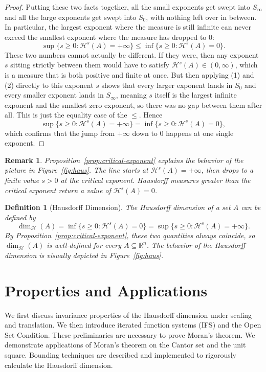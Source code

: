 \documentclass{article}
\newtheorem{definition}{Definition}
\newtheorem{remark}{Remark}
\begin{document}
\begin{proof}
Putting these two facts together, all the small exponents get swept into $S_\infty$ and all the large exponents get swept into $S_0$, with nothing left over in between. In particular, the largest exponent where the measure is still infinite can never exceed the smallest exponent where the measure has dropped to $0$:
$$
\sup\{s \ge 0 : \mathcal{H}^s(A) = +\infty\} \le \inf\{s \ge 0 : \mathcal{H}^s(A) = 0\}.
$$
These two numbers cannot actually be different. If they were, then any exponent $s$ sitting strictly between them would have to satisfy $\mathcal{H}^s(A) \in (0,\infty)$, which is a measure that is both positive and finite at once. But then applying (1) and (2) directly to this exponent $s$ shows that every larger exponent lands in $S_0$ and every smaller exponent lands in $S_\infty$, meaning $s$ itself is the largest infinite exponent and the smallest zero exponent, so there was no gap between them after all. This is just the equality case of the $\leq$. Hence
$$
\sup\{s \ge 0 : \mathcal{H}^s(A) = +\infty\} = \inf\{s \ge 0 : \mathcal{H}^s(A) = 0\},
$$
which confirms that the jump from $+\infty$ down to $0$ happens at one single exponent.
\end{proof}

\begin{remark}
Proposition~\ref{prop:critical-exponent} explains the behavior of the picture in Figure~\ref{fig:haus}. The line starts at $\mathcal{H}^{s}(A) = +\infty$, then drops to a finite value $s>0$ at the critical exponent. Hausdorff measures greater than the critical exponent return a value of $\mathcal{H}^{s}(A)=0$.
\end{remark}

\begin{definition}[Hausdorff Dimension]
The Hausdorff dimension of a set $A$ can be defined by
$$\boxed{
\dim_{\mathcal{H}}(A) = \inf\{s \ge 0 : \mathcal{H}^s(A) = 0\} = \sup\{s \ge 0 : \mathcal{H}^s(A) = +\infty\}.
}$$
By Proposition~\ref{prop:critical-exponent}, these two quantities always coincide, so $\dim_{\mathcal{H}}(A)$ is well-defined for every $A \subseteq \mathbb{R}^n$. The behavior of the Hausdorff dimension is visually depicted in Figure~\ref{fig:haus}.
\end{definition}


\section{Properties and Applications}

We first discuss invariance properties of the Hausdorff dimension under scaling and translation. We then introduce iterated function systems (IFS) and the Open Set Condition. These preliminaries are necessary to prove Moran's theorem. We demonstrate applications of Moran's theorem on the Cantor set and the unit square. Bounding techniques are described and implemented to rigorously calculate the Hausdorff dimension.
\end{document}
